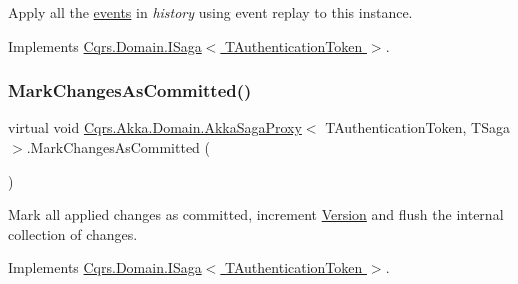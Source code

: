Apply all the \hyperlink{}{events} in {\itshape history}  using event replay to this instance. 



Implements \hyperlink{interfaceCqrs_1_1Domain_1_1ISaga_a2714804684bc65cf4dec79b4697b9b21_a2714804684bc65cf4dec79b4697b9b21}{Cqrs.\+Domain.\+I\+Saga$<$ T\+Authentication\+Token $>$}.

\mbox{\label{classCqrs_1_1Akka_1_1Domain_1_1AkkaSagaProxy_a5a5c012bc0f7f957b8bd2298956ca9ae_a5a5c012bc0f7f957b8bd2298956ca9ae}} 
\subsubsection{\texorpdfstring{Mark\+Changes\+As\+Committed()}{MarkChangesAsCommitted()}}
{\footnotesize\ttfamily virtual void \hyperlink{classCqrs_1_1Akka_1_1Domain_1_1AkkaSagaProxy}{Cqrs.\+Akka.\+Domain.\+Akka\+Saga\+Proxy}$<$ T\+Authentication\+Token, T\+Saga $>$.Mark\+Changes\+As\+Committed (\begin{DoxyParamCaption}{ }\end{DoxyParamCaption})\hspace{0.3cm}{\ttfamily [virtual]}}



Mark all applied changes as committed, increment \hyperlink{classCqrs_1_1Akka_1_1Domain_1_1AkkaSagaProxy_ab6272400fe5c6227a11cf5c93f752d4d_ab6272400fe5c6227a11cf5c93f752d4d}{Version} and flush the internal collection of changes. 



Implements \hyperlink{interfaceCqrs_1_1Domain_1_1ISaga_a85c75f80bc5be4bad7f1d9f1231bfba7_a85c75f80bc5be4bad7f1d9f1231bfba7}{Cqrs.\+Domain.\+I\+Saga$<$ T\+Authentication\+Token $>$}.

\mbox{\label{classCqrs_1_1Akka_1_1Domain_1_1AkkaSagaProxy_aec2b133ce13d4bcda56de80f9637330a_aec2b133ce13d4bcda56de80f9637330a}} 
